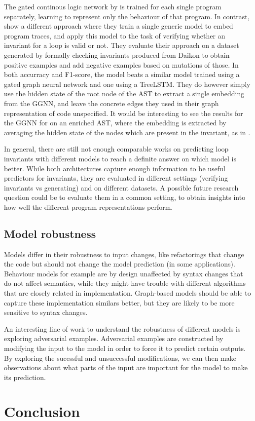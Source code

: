 \documentclass[sigconf,authordraft=true,nonacm=true]{acmart}
\begin{document}
The gated continous logic network by \citet{yao_learning_2020} is trained for each single program separately, learning to represent only the behaviour of that program.
In contrast, \citet{wang_learning_2019} show a different approach where they train a single generic model to embed program traces, and apply this model to the task of verifying whether an invariant for a loop is valid or not.
They evaluate their approach on a dataset generated by formally checking invariants produced from Daikon to obtain positive examples and add negative examples based on mutations of those.
In both accurracy and F1-score, the model beats a similar model trained using a gated graph neural network and one using a TreeLSTM.
They do however simply use the hidden state of the root node of the AST to extract a single embedding from the GGNN, and leave the concrete edges they used in their graph representation of code unspecified.
It would be interesting to see the results for the GGNN for on an enriched AST, where the embedding is extracted by averaging the hidden state of the nodes which are present in the invariant, as in \citet{hellendoorn_are_2019}.

In general, there are still not enough comparable works on predicting loop invariants with different models to reach a definite answer on which model is better.
While both architectures capture enough information to be useful predictors for invariants, they are evaluated in different settings (verifying invariants vs generating) and on different datasets.
A possible future research question could be to evaluate them in a common setting, to obtain insights into how well the different program representations perform.

\subsection{Model robustness}
Models differ in their robustness to input changes, like refactorings that change the code but should not change the model prediction (in some applications).
Behaviour models for example are by design unaffected by syntax changes that do not affect semantics, while they might have trouble with different algorithms that are closely related in implementation.
Graph-based models should be able to capture these implementation similars better, but they are likely to be more sensitive to syntax changes.

An interesting line of work to understand the robustness of different models is exploring adversarial examples.
Adversarial examples are constructed by modifying the input to the model in order to force it to predict certain outputs.
By exploring the sucessful and unsuccessful modifications, we can then make observations about what parts of the input are important for the model to make its prediction.



\section{Conclusion}

\FloatBarrier



\end{document}
